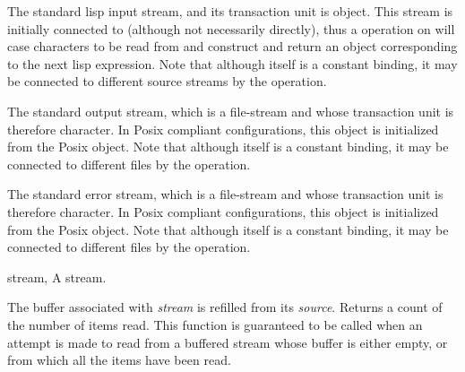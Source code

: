 \begin{optDefinition}
\remarks%
The standard lisp input stream, and its transaction unit is object. This stream
is initially connected to  (although not necessarily
directly), thus a  operation on  will case
characters to be read from  and construct and return an
object corresponding to the next lisp expression. Note that although
 itself is a constant binding, it may be connected to
different source streams by the  operation.

\remarks%
The standard output stream, which is a file-stream and whose transaction unit is
therefore character. In Posix compliant configurations, this object is
initialized from the Posix  object. Note that although
 itself is a constant binding, it may be connected to
different files by the  operation.

\remarks%
The standard error stream, which is a file-stream and whose transaction unit is
therefore character. In Posix compliant configurations, this object is
initialized from the Posix  object. Note that although
 itself is a constant binding, it may be connected to
different files by the  operation.

\label{Buffer-management}

\begin{genericargs}
    \item[stream, \classref{buffered-stream}] A stream.
\end{genericargs}
%
\result%
The buffer associated with {\em stream\/} is refilled from its {\em
    source\/}.  Returns a count of the number of items read.
%
\remarks%
This
function is guaranteed to be called when an attempt is made to read from a
buffered stream whose buffer is either empty, or from which all the items have
been read.


\end{optDefinition}
